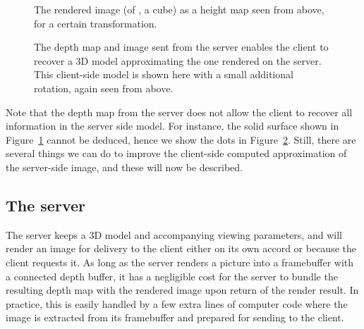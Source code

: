 \begin{figure}[htb]
  \centering
  
  \caption{\label{fig:2Dheightmap}
           The rendered image (of \eg, a cube) as a height map seen from above,
           for a certain transformation.}
\end{figure}

\begin{figure}[htb]
  \centering
  \caption{\label{fig:2DheightmapRotated}
           The depth map and image sent from the server enables the client to
           recover a 3D model approximating the one rendered on the server. This
           client-side model is shown here with a small additional rotation, again
           seen from above.}
\end{figure}

Note that the depth map from the server does not allow the client to recover all
information in the server side model. For instance, the solid surface shown in
Figure~\ref{fig:2Dheightmap} cannot be deduced, hence we show the dots in
Figure~\ref{fig:2DheightmapRotated}. Still, there are several things we can do
to improve the client-side computed approximation of the server-side image, and
these will now be described.

\subsection{The server}

The server keeps a 3D model and accompanying viewing parameters, and will render
an image for delivery to the client either on its own accord or because the
client requests it. As long as the server renders a picture into a framebuffer
with a connected depth buffer, it has a negligible cost for the server to bundle
the resulting depth map with the rendered image upon return of the render
result. In practice, this is easily handled by a few extra lines of computer
code where the image is extracted from its framebuffer and prepared for sending
to the client.

